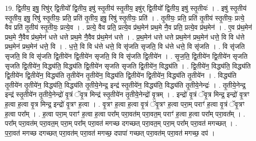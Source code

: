 \documentclass[17pt]{extarticle}
\begin{document}
19. द्वि॒तीय॒ इषु॒ रिषु॑र् द्वि॒तीयो᳚ द्वि॒तीय॒ इषु॑ स्तृ॒तीय॑ स्तृ॒तीय॒ इषु॑र् द्वि॒तीयो᳚ द्वि॒तीय॒ इषु॑ स्तृ॒तीयः॑ । . इषु॑ स्तृ॒तीय॑ स्तृ॒तीय॒ इषु॒ रिषु॑ स्तृ॒तीयः॒ प्रति॒ प्रति॑ तृ॒तीय॒ इषु॒ रिषु॑ स्तृ॒तीयः॒ प्रति॑ । . तृ॒तीयः॒ प्रति॒ प्रति॑ तृ॒तीय॑ स्तृ॒तीयः॒ प्रत्ये॒ वैव प्रति॑ तृ॒तीय॑ स्तृ॒तीयः॒ प्रत्ये॒व । . प्रत्ये॒ वैव प्रति॒ प्रत्ये॒व प्र॑थ॒मेन॑ प्रथ॒मे नै॒व प्रति॒ प्रत्ये॒व प्र॑थ॒मेन॑ । . ए॒व प्र॑थ॒मेन॑ प्रथ॒मे नै॒वैव प्र॑थ॒मेन॑ धत्ते धत्ते प्रथ॒मे नै॒वैव प्र॑थ॒मेन॑ धत्ते । . प्र॒थ॒मेन॑ धत्ते धत्ते प्रथ॒मेन॑ प्रथ॒मेन॑ धत्ते॒ वि वि ध॑त्ते प्रथ॒मेन॑ प्रथ॒मेन॑ धत्ते॒ वि । . ध॒त्ते॒ वि वि ध॑त्ते धत्ते॒ वि सृ॑जति सृजति॒ वि ध॑त्ते धत्ते॒ वि सृ॑जति । . वि सृ॑जति सृजति॒ वि वि सृ॑जति द्वि॒तीये॑न द्वि॒तीये॑न सृजति॒ वि वि सृ॑जति द्वि॒तीये॑न । . सृ॒ज॒ति॒ द्वि॒तीये॑न द्वि॒तीये॑न सृजति सृजति द्वि॒तीये॑न॒ विद्ध्य॑ति॒ विद्ध्य॑ति द्वि॒तीये॑न सृजति सृजति द्वि॒तीये॑न॒ विद्ध्य॑ति । . द्वि॒तीये॑न॒ विद्ध्य॑ति॒ विद्ध्य॑ति द्वि॒तीये॑न द्वि॒तीये॑न॒ विद्ध्य॑ति तृ॒तीये॑न तृ॒तीये॑न॒ विद्ध्य॑ति द्वि॒तीये॑न द्वि॒तीये॑न॒ विद्ध्य॑ति तृ॒तीये॑न । . विद्ध्य॑ति तृ॒तीये॑न तृ॒तीये॑न॒ विद्ध्य॑ति॒ विद्ध्य॑ति तृ॒तीये॒नेन्द्र॒ इन्द्र॑ स्तृ॒तीये॑न॒ विद्ध्य॑ति॒ विद्ध्य॑ति तृ॒तीये॒नेन्द्रः॑ । . तृ॒तीये॒नेन्द्र॒ इन्द्र॑ स्तृ॒तीये॑न तृ॒तीये॒नेन्द्रो॑ वृ॒त्रं ॅवृ॒त्र मिन्द्र॑ स्तृ॒तीये॑न तृ॒तीये॒नेन्द्रो॑ वृ॒त्रम् । . इन्द्रो॑ वृ॒त्रं ॅवृ॒त्र मिन्द्र॒ इन्द्रो॑ वृ॒त्रꣳ ह॒त्वा ह॒त्वा वृ॒त्र मिन्द्र॒ इन्द्रो॑ वृ॒त्रꣳ ह॒त्वा । . वृ॒त्रꣳ ह॒त्वा ह॒त्वा वृ॒त्रं ॅवृ॒त्रꣳ ह॒त्वा परा॒म् पराꣳ॑ ह॒त्वा वृ॒त्रं ॅवृ॒त्रꣳ ह॒त्वा परा᳚म् । . ह॒त्वा परा॒म् पराꣳ॑ ह॒त्वा ह॒त्वा परा᳚म् परा॒वत॑म् परा॒वत॒म् पराꣳ॑ ह॒त्वा ह॒त्वा परा᳚म् परा॒वत᳚म् । . परा᳚म् परा॒वत॑म् परा॒वत॒म् परा॒म् परा᳚म् परा॒वत॑ मगच्छ दगच्छत् परा॒वत॒म् परा॒म् परा᳚म् परा॒वत॑ मगच्छत् । . प॒रा॒वत॑ मगच्छ दगच्छत् परा॒वत॑म् परा॒वत॑ मगच्छ॒ दपापा॑ गच्छत् परा॒वत॑म् परा॒वत॑ मगच्छ॒ दप॑ । \newline
\end{document}
